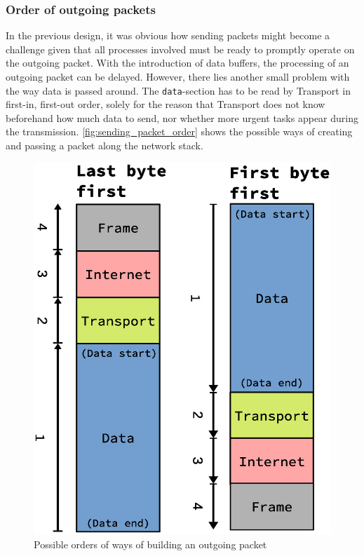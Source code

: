 \subsubsection{Order of outgoing packets}
In the previous design, it was obvious how sending packets might become a challenge
given that all processes involved must be ready to promptly operate on the
outgoing packet. With the introduction of data buffers, the processing of an
outgoing packet can be delayed.
However, there lies another small problem with the way data is passed around.
The \texttt{data}-section has to be read by Transport in first-in, first-out
order, solely for the reason that Transport does not know beforehand how much
data to send, nor whether more urgent tasks appear during the transmission.
\autoref{fig:sending_packet_order} shows the possible ways of creating and
passing a packet along the network stack.
\begin{figure}
    \centering
    \includegraphics[width=\linewidth]{design/sending_packet_order.eps}
    \caption{Possible orders of ways of building an outgoing packet}
    \label{fig:sending_packet_order}
\end{figure}
